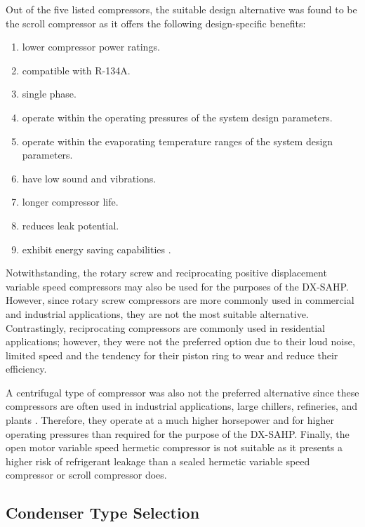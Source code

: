\medskip
Out of the five listed compressors, the suitable design alternative was found to be the scroll compressor as it offers the following design-specific benefits:

\medskip
\begin{enumerate}[itemsep=3mm, parsep=-1mm]
    \item lower compressor power ratings.
    \item compatible with R-134A.
    \item single phase.
    \item operate within the operating pressures of the system design parameters.
    \item operate within the evaporating temperature ranges of the system design parameters.
    \item have low sound and vibrations.
    \item longer compressor life.
    \item reduces leak potential.
    \item exhibit energy saving capabilities \cite{scroll_compressor} \cite{what_scroll_compressor}.
\end{enumerate}

\medskip
Notwithstanding, the rotary screw and reciprocating positive displacement variable speed compressors may also be used for the purposes of the DX-SAHP. However, since rotary screw compressors are more commonly used in commercial and industrial applications, they are not the most suitable alternative. Contrastingly, reciprocating compressors are commonly used in residential applications; however, they were not the preferred option due to their loud noise, limited speed and the tendency for their piston ring to wear and reduce their efficiency.

\medskip
A centrifugal type of compressor was also not the preferred alternative since these compressors are often used in industrial applications, large chillers, refineries, and plants \cite{centrifugal_compressor}. Therefore, they operate at a much higher horsepower and for higher operating pressures than required for the purpose of the DX-SAHP. Finally, the open motor variable speed hermetic compressor is not suitable as it presents a higher risk of refrigerant leakage than a sealed hermetic variable speed compressor or scroll compressor does.

\subsection{Condenser Type Selection}


